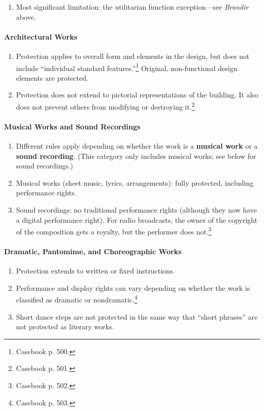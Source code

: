 \begin{enumerate}
    \item Most significant limitation: the utilitarian function 
    exception---see \emph{Brandir} above.
\end{enumerate}

\paragraph{Architectural Works}

\begin{enumerate}
    \item Protection applies to overall form and elements in the design, but 
    does not include ``individual standard features.''\footnote{Casebook p. 
    500.} Original, non-functional design elements are protected.
    \item Protection does not extend to pictorial representations of the 
    building. It also does not prevent others from modifying or destroying 
    it.\footnote{Casebook p. 501.}
\end{enumerate}

\paragraph{Musical Works and Sound Recordings}

\begin{enumerate}
    \item Different rules apply depending on whether the work is a 
    \textbf{musical work} or a \textbf{sound recording}. (This category only 
    includes musical works; see below for sound recordings.)
    \item Musical works (sheet music, lyrics, arrangements): fully protected, 
    including performance rights.
    \item Sound recordings: no traditional performance rights (although they 
    now have a digital performance right). For radio broadcasts, the owner of 
    the copyright of the composition gets a royalty, but the performer does 
    not.\footnote{Casebook p. 502.}
\end{enumerate}

\paragraph{Dramatic, Pantomime, and Choreographic Works}

\begin{enumerate}
    \item Protection extends to written or fixed instructions. 
    \item Performance and display rights can vary depending on whether the 
    work is classified as dramatic or nondramatic.\footnote{Casebook p. 503.}
    \item Short dance steps are not protected in the same way that ``short 
    phrases'' are not protected as literary works.
\end{enumerate}

